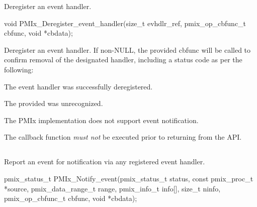 \summary

Deregister an event handler.

\format

\cspecificstart
\begin{codepar}
void
PMIx_Deregister_event_handler(size_t evhdlr_ref,
                              pmix_op_cbfunc_t cbfunc,
                              void *cbdata);
\end{codepar}
\cspecificend

\begin{arglist}
\end{arglist}

\descr

Deregister an event handler. If non-NULL, the provided cbfunc will be called to confirm removal of the designated handler, including a status code as per the following:

\begin{constantdesc}
\item {} The event handler was successfully deregistered.
\item {} The provided  was unrecognized.
\item {} The \ac{PMIx} implementation does not support event notification.
\end{constantdesc}

The callback function \emph{must not} be executed prior to returning from the \ac{API}.

\subsection{}

\summary

Report an event for notification via any
registered event handler.

\format

\cspecificstart
\begin{codepar}
pmix_status_t
PMIx_Notify_event(pmix_status_t status,
                  const pmix_proc_t *source,
                  pmix_data_range_t range,
                  pmix_info_t info[], size_t ninfo,
                  pmix_op_cbfunc_t cbfunc, void *cbdata);
\end{codepar}
\cspecificend


